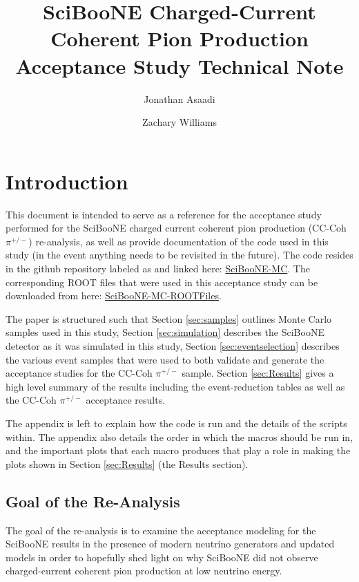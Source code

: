 \documentclass[11pt]{article}
\title{SciBooNE Charged-Current Coherent Pion Production Acceptance Study Technical Note}
\author[1]{Jonathan Asaadi}
\author[1]{Zachary Williams}
\affil[1]{Department of Physics, The University of Texas at Arlington}
\begin{document}
\begin{minipage}[h]{\textwidth}
\maketitle
\end{minipage}



\section{Introduction}\label{sec:introduction}
This document is intended to serve as a reference for the acceptance study performed for the SciBooNE charged current coherent pion production (CC-Coh $\pi^{+/-}$) re-analysis, as well as provide documentation of the code used in this study (in the event anything needs to be revisited in the future). The code resides in the github repository labeled as and linked here: \href{https://github.com/williamszg/SciBooNE-MC}{SciBooNE-MC}. The corresponding ROOT files that were used in this acceptance study can be downloaded from here: \href{https://drive.google.com/open?id=0B4rvJl9swUOxcEtpSl94RDRsc3c}{SciBooNE-MC-ROOTFiles}.

The paper is structured such that Section \ref*{sec:samples} outlines Monte Carlo samples used in this study, Section \ref*{sec:simulation} describes the SciBooNE detector as it was simulated in this study, Section \ref*{sec:eventselection} describes the various event samples that were used to both validate and generate the acceptance studies for the CC-Coh $\pi^{+/-}$ sample. Section \ref*{sec:Results} gives a high level summary of the results including the event-reduction tables as well as the CC-Coh $\pi^{+/-}$ acceptance results.

The appendix is left to explain how the code is run and the details of the scripts within. The appendix also details the order in which the macros should be run in, and the important plots that each macro produces that play a role in making the plots shown in Section \ref*{sec:Results} (the Results section).

\subsection{Goal of the Re-Analysis}\label{sec:goals}
The goal of the re-analysis is to examine the acceptance modeling for the SciBooNE results in the presence of modern neutrino generators and updated models in order to hopefully shed light on why SciBooNE did not observe charged-current coherent pion production at low neutrino energy.
\end{document}

